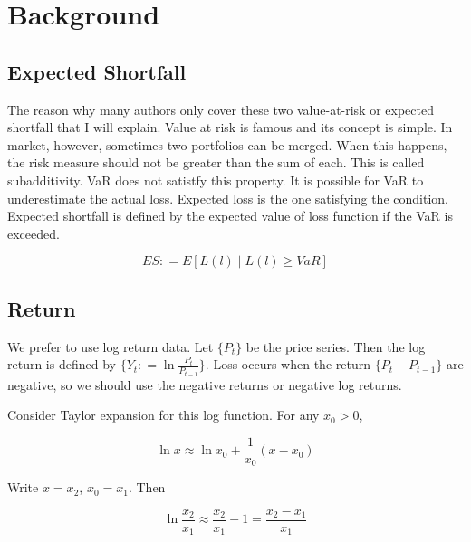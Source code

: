 \documentclass[
]{article}
\theoremstyle{definition}
\theoremstyle{definition}
\theoremstyle{definition}
\theoremstyle{remark}
\begin{document}
\hypertarget{background}{%
\section{Background}\label{background}}

\hypertarget{expected-shortfall}{%
\subsection{Expected Shortfall}\label{expected-shortfall}}

The reason why many authors only cover these two value-at-risk or expected shortfall that I will explain. Value at risk is famous and its concept is simple. In market, however, sometimes two portfolios can be merged. When this happens, the risk measure should not be greater than the sum of each. This is called subadditivity. VaR does not satistfy this property. It is possible for VaR to underestimate the actual loss. Expected loss is the one satisfying the condition. Expected shortfall is defined by the expected value of loss function if the VaR is exceeded.

\begin{equation}
  ES \mathpunct{:}=E \left[ L(l) \mid L(l) \ge VaR \right]
  \label{eq:esdef}
\end{equation}

\hypertarget{return}{%
\subsection{Return}\label{return}}

We prefer to use log return data. Let \(\{ P_t \}\) be the price series. Then the log return is defined by \(\{ Y_t \mathpunct{:}=\ln \frac{P_t}{P_{t - 1}} \}\). Loss occurs when the return \(\{ P_t - P_{t - 1} \}\) are negative, so we should use the negative returns or negative log returns.

Consider Taylor expansion for this log function. For any \(x_0 > 0\),

\begin{equation}
  \ln x \approx \ln x_0 + \frac{1}{x_0}(x - x_0)
\end{equation}

Write \(x = x_2\), \(x_0 = x_1\). Then

\begin{equation}
  \ln \frac{x_2}{x_1} \approx \frac{x_2}{x_1} - 1 = \frac{x_2 - x_1}{x_1}
  \label{eq:logpercent}
\end{equation}
\end{document}
